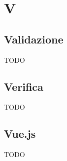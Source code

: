 \section{V}

\vspace{2em}
\subsection*{Validazione}
TODO

\vspace{2em}
\subsection*{Verifica}
TODO

\vspace{2em}
\subsection*{Vue.js}
TODO
